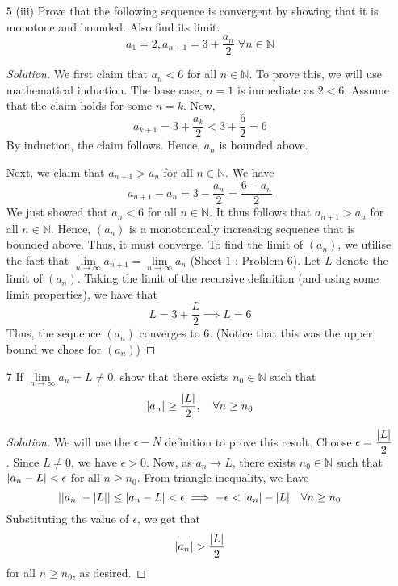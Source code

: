 \documentclass[12pt]{article}
\def\ddfrac#1#2{\displaystyle\frac{\displaystyle #1}{\displaystyle #2}}
\theoremstyle{definition}
\newenvironment{soln}{\begin{proof}[Solution]}{\end{proof}}
\begin{document}
\begin{enumerate}[leftmargin=*]
\begin{soln}
    \end{soln}
    
    \newpage
    
    \item[5 (iii)] Prove that the following sequence is convergent by showing that it is monotone and bounded. Also find its limit. 
    \[
        a_1 = 2, a_{n+1} = 3 + \frac{a_n}{2} \; \forall n \in \mathbb{N}
    \]
    
    \begin{soln}
        We first claim that $a_n < 6$ for all $n \in \mathbb{N}$. To prove this, we will use mathematical induction. The base case, $n=1$ is immediate as $2<6$. Assume that the claim holds for some $n=k$. Now, 
        \[
            a_{k+1} = 3 + \frac{a_k}{2} < 3 + \frac{6}{2} = 6
        \]
        By induction, the claim follows. Hence, $a_n$ is bounded above. 
        \medskip
        
        Next, we claim that $a_{n+1} > a_n$ for all $n \in \mathbb{N}$. We have
        \[
            a_{n+1} - a_n = 3 - \frac{a_n}{2} = \frac{6-a_n}{2}
        \]
        We just showed that $a_n < 6$ for all $n \in \mathbb{N}$. It thus follows that $a_{n+1} > a_n$ for all $n \in \mathbb{N}$. Hence, $(a_n)$ is a monotonically increasing sequence that is bounded above. Thus, it must converge. To find the limit of $(a_n)$, we utilise the fact that $\lim\limits_{n \to \infty} a_{n+1} = \lim\limits_{n \to \infty} a_n$ (Sheet $1$ : Problem $6$). Let $L$ denote the limit of $(a_n)$. Taking the limit of the recursive definition (and using some limit properties), we have that
        \[
            L = 3 + \frac{L}{2} \implies L = 6
        \]
        Thus, the sequence $(a_n)$ converges to 6. (Notice that this was the upper bound we chose for $(a_n)$)
    \end{soln}
    
    \newpage
    
    \item[7] If $\lim\limits_{n \to \infty} a_n = L \neq 0$, show that there exists $n_0 \in \mathbb{N}$ such that
    \[
        \abs{a_n} \geq \frac{\abs{L}}{2}, \quad \forall n \geq n_0
    \]
    
    \begin{soln}
        We will use the $\epsilon-N$ definition to prove this result. Choose $\epsilon = \ddfrac{\abs{L}}{2}$. Since $L \neq 0$, we have $\epsilon > 0$. Now, as $a_n \to L$, there exists $n_0 \in \mathbb{N}$ such that $\abs{a_n - L} < \epsilon$ for all $n \geq n_0$. From triangle inequality, we have
        \[
            \abs{\abs{a_n} - \abs{L}} \leq \abs{a_n - L} < \epsilon \implies -\epsilon < \abs{a_n} - \abs{L} \quad \forall n \geq n_0
        \]
        Substituting the value of $\epsilon$, we get that
        \[
            \abs{a_n} > \frac{\abs{L}}{2}
        \]
        for all $n \geq n_0$, as desired.
    \end{soln}
    

\end{enumerate}
\end{document}
